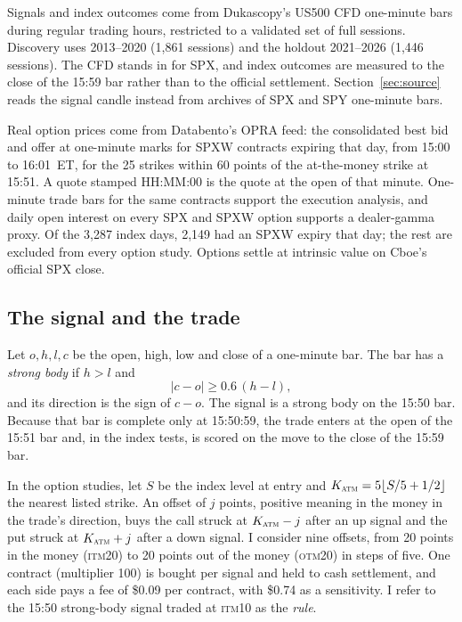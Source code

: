 \documentclass[12pt,letterpaper]{article}
\newcommand{\ITM}[1]{\textsc{itm}#1}
\newcommand{\OTM}[1]{\textsc{otm}#1}
\begin{document}
Signals and index outcomes come from Dukascopy's US500 CFD one-minute bars during
regular trading hours, restricted to a validated set of full sessions. Discovery
uses 2013--2020 (1{,}861 sessions) and the holdout 2021--2026 (1{,}446 sessions).
The CFD stands in for SPX, and index outcomes are measured to the close of the
15:59 bar rather than to the official settlement. Section~\ref{sec:source} reads
the signal candle instead from archives of SPX and SPY one-minute bars.

Real option prices come from Databento's OPRA feed: the consolidated best bid and
offer at one-minute marks for SPXW contracts expiring that day, from 15:00 to
16:01~ET, for the 25 strikes within 60 points of the at-the-money strike at
15:51. A quote stamped HH:MM:00 is the quote at the open of that minute.
One-minute trade bars for the same contracts support the execution analysis, and
daily open interest on every SPX and SPXW option supports a dealer-gamma proxy.
Of the 3{,}287 index days, 2{,}149 had an SPXW expiry that day; the rest are
excluded from every option study. Options settle at intrinsic value on Cboe's
official SPX close.

\subsection{The signal and the trade}
\label{sec:signal}

Let $o, h, l, c$ be the open, high, low and close of a one-minute bar. The bar
has a \emph{strong body} if $h > l$ and
\begin{equation}
|c - o| \ge 0.6\,(h - l),
\end{equation}
and its direction is the sign of $c - o$. The signal is a strong body on the
15:50 bar. Because that bar is complete only at 15:50:59, the trade enters at the
open of the 15:51 bar and, in the index tests, is scored on the move to the close
of the 15:59 bar.

In the option studies, let $S$ be the index level at entry and
$K_{\textsc{atm}} = 5\lfloor S/5 + 1/2\rfloor$ the nearest listed strike. An
offset of $j$ points, positive meaning in the money in the trade's direction,
buys the call struck at $K_{\textsc{atm}} - j$ after an up signal and the put
struck at $K_{\textsc{atm}} + j$ after a down signal. I consider nine offsets,
from 20 points in the money (\ITM{20}) to 20 points out of the money (\OTM{20})
in steps of five. One contract (multiplier 100) is bought per signal and held to
cash settlement, and each side pays a fee of \$0.09 per contract, with \$0.74 as
a sensitivity. I refer to the 15:50 strong-body signal traded at \ITM{10} as the \emph{rule}.
\end{document}
